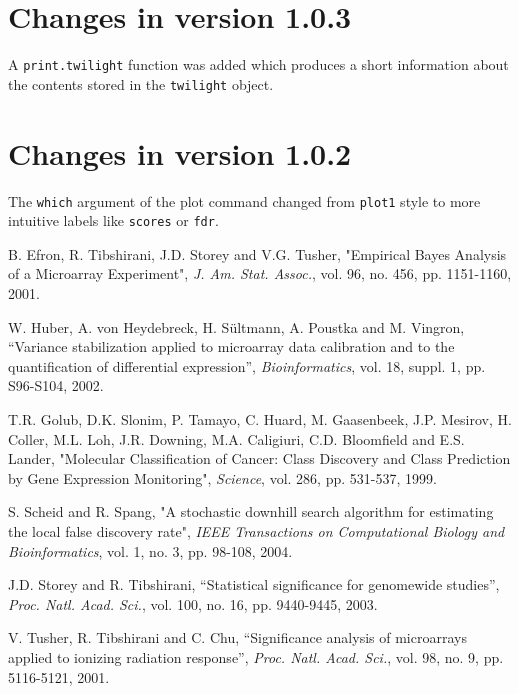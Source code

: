 \documentclass[11pt,a4paper,fleqn]{report}
\newcommand{\Robject}[1]{{\texttt{#1}}}
\newcommand{\Rfunction}[1]{{\texttt{#1}}}
\newcommand{\Rfunarg}[1]{{\texttt{#1}}}
\begin{document}
\section{Changes in version 1.0.3}

A \Rfunction{print.twilight} function was added which produces a short information about the contents stored in the \Robject{twilight} object.


\section{Changes in version 1.0.2}

The \Rfunarg{which} argument of the plot command changed from \Rfunction{plot1} style to more intuitive labels like \Rfunarg{scores} or \Rfunarg{fdr}.

       




       







       
\begin{thebibliography}{1}

B. Efron, R. Tibshirani, J.D. Storey and V.G. Tusher, "Empirical Bayes Analysis of a Microarray Experiment", \emph{J. Am. Stat. Assoc.}, vol. 96, no. 456, pp. 1151-1160, 2001.

W. Huber, A. von Heydebreck, H. S{\"u}ltmann, A. Poustka and M. Vingron, ``Variance stabilization applied to microarray data calibration and to the quantification of differential expression'', \emph{Bioinformatics}, vol. 18, suppl. 1, pp. S96-S104, 2002.

T.R. Golub, D.K. Slonim, P. Tamayo, C. Huard, M. Gaasenbeek, J.P. Mesirov, H. Coller, M.L. Loh, J.R. Downing, M.A. Caligiuri, C.D. Bloomfield and E.S. Lander, "Molecular Classification of Cancer: Class Discovery and Class Prediction by Gene Expression Monitoring", \emph{Science}, vol. 286, pp. 531-537, 1999.

S. Scheid and R. Spang, "A stochastic downhill search algorithm for estimating the local false discovery rate", \emph{IEEE Transactions on Computational Biology and Bioinformatics}, vol. 1, no. 3, pp. 98-108, 2004.

J.D. Storey and R. Tibshirani, ``Statistical significance for genomewide studies'', \textit{Proc. Natl. Acad. Sci.}, vol. 100, no. 16, pp. 9440-9445, 2003.

V. Tusher, R. Tibshirani and C. Chu, ``Significance analysis of microarrays applied to ionizing radiation response'', \textit{Proc. Natl. Acad. Sci.}, vol. 98, no. 9, pp. 5116-5121, 2001.

\end{thebibliography}
\end{document}
